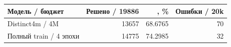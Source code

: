 \begin{tabular}{lrrr}
\toprule
Модель / бюджет & Решено / 19886 & \pass{}, \% & Ошибки / 20k \\
\midrule
Distinct4m / 4M & 13657 & 68.6765 & 70 \\
Полный train / 4 эпохи & 14775 & 74.2985 & 32 \\
\bottomrule
\end{tabular}
